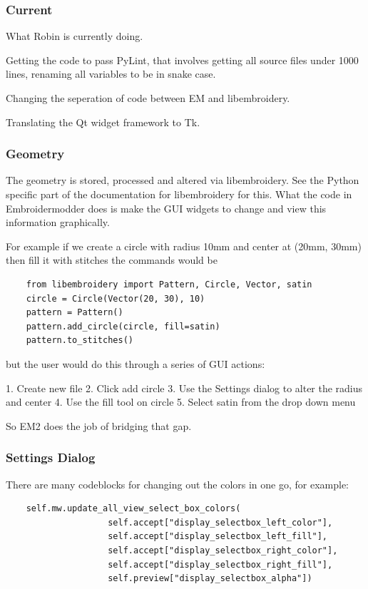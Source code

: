 \documentclass[a4paper, 11pt]{report}
\begin{document}
\subsubsection{Current}

What Robin is currently doing.

Getting the code to pass PyLint, that involves getting all source files
under 1000 lines, renaming all variables to be in snake case.

Changing the seperation of code between EM and libembroidery.

Translating the Qt widget framework to Tk.

\subsubsection{Geometry}

The geometry is stored, processed and altered via libembroidery. See the Python specific part of the documentation for libembroidery for this. What the code in Embroidermodder does is make the GUI widgets to change and view this information graphically.

For example if we create a circle with radius 10mm and center at (20mm, 30mm) then fill it with stitches the commands would be

\begin{verbatim}
    from libembroidery import Pattern, Circle, Vector, satin
    circle = Circle(Vector(20, 30), 10)
    pattern = Pattern()
    pattern.add_circle(circle, fill=satin)
    pattern.to_stitches()
\end{verbatim}

but the user would do this through a series of GUI actions:

1. Create new file
2. Click add circle
3. Use the Settings dialog to alter the radius and center
4. Use the fill tool on circle
5. Select satin from the drop down menu

So EM2 does the job of bridging that gap.

\subsubsection{Settings Dialog}

There are many codeblocks for changing out the colors in one go, for example:
    
\begin{verbatim}
    self.mw.update_all_view_select_box_colors(
                    self.accept["display_selectbox_left_color"],
                    self.accept["display_selectbox_left_fill"],
                    self.accept["display_selectbox_right_color"],
                    self.accept["display_selectbox_right_fill"],
                    self.preview["display_selectbox_alpha"])
\end{verbatim}
\end{document}
